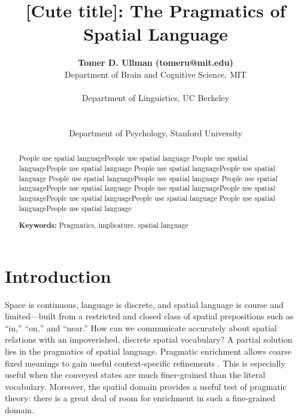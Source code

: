 \documentclass[10pt,letterpaper]{article}
\title{[Cute title]: The Pragmatics of Spatial Language}
\author{
{\large \bf Tomer D. Ullman (tomeru@mit.edu)} \\
  Department of Brain and Cognitive Science, MIT\\
  \And{\large \bf Yang Xu (yang\_xu\_ch@berkeley.edu)} \\
  Department of Linguistics, UC Berkeley \\
  \\
 \AND{\large \bf Noah D. Goodman (ngoodman@stanford.edu)} \\
  Department of Psychology, Stanford University\\
}
\newcommand{\ndg}[1]{\textcolor{Green}{[ndg: #1]}}
\begin{document}
\maketitle

\begin{abstract}
People use spatial languagePeople use spatial language
People use spatial languagePeople use spatial language
People use spatial languagePeople use spatial language
People use spatial languagePeople use spatial language
People use spatial languagePeople use spatial language
People use spatial languagePeople use spatial languagePeople use spatial languagePeople use spatial language
People use spatial languagePeople use spatial language

\textbf{Keywords:} 
Pragmatics, implicature, spatial language
\end{abstract}

\section{Introduction}
Space is continuous, language is discrete, and spatial language is course and limited---built from a restricted and closed class of spatial prepositions \cite{talmy83,talmy00,landau93} such as ``in,'' ``on,'' and ``near.'' 
How can we communicate accurately about spatial relations with an impoverished, discrete spatial vocabulary?
A partial solution lies in the pragmatics of spatial language.
Pragmatic enrichment allows coarse fixed meanings to gain useful context-specific refinements \cite{grice75,horn84}.
This is especially useful when the conveyed states are much finer-grained than the literal vocabulary. Moreover, the spatial domain provides a useful test of pragmatic theory: there is a great deal of room for enrichment in such a fine-grained domain.

%
\end{document}
